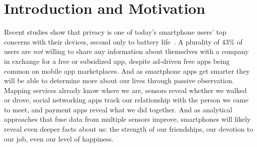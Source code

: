
\section{Introduction and Motivation}
\label{sec-introduction}

Recent studies show that privacy is one of today's smartphone users' top
concerns with their devices, second only to battery
life~\cite{truste-privacy}. A plurality of 43\% of users are \textit{not}
willing to share any information about themselves with a company in exchange
for a free or subsidized app, despite ad-driven free apps being common on
mobile app marketplaces. And as smartphone apps get smarter they will be able
to determine more about our lives through passive observation. Mapping
services already know where we are, sensors reveal whether we walked or
drove, social networking apps track our relationship with the person we came
to meet, and payment apps reveal what we did together. And as analytical
approaches that fuse data from multiple sensors improve, smartphones will
likely reveal even deeper facts about us: the strength of our friendships,
our devotion to our job, even our level of happiness.



